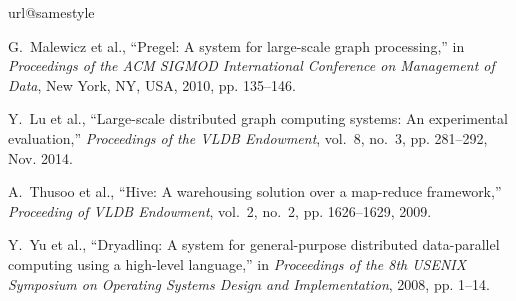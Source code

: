 \documentclass[10pt,journal,compsoc]{IEEEtran}
\begin{document}
% 
% 
%
\begin{thebibliography}{40}
\providecommand{\url}[1]{#1}
\csname url@samestyle\endcsname
\providecommand{\newblock}{\relax}
\providecommand{\bibinfo}[2]{#2}
\providecommand{\BIBentrySTDinterwordspacing}{\spaceskip=0pt\relax}
\providecommand{\BIBentryALTinterwordstretchfactor}{4}
\providecommand{\BIBentryALTinterwordspacing}{\spaceskip=\fontdimen2\font plus
\BIBentryALTinterwordstretchfactor\fontdimen3\font minus
  \fontdimen4\font\relax}
\providecommand{\BIBforeignlanguage}[2]{{%
\expandafter\ifx\csname l@#1\endcsname\relax
\typeout{** WARNING: IEEEtran.bst: No hyphenation pattern has been}%
\typeout{** loaded for the language `#1'. Using the pattern for}%
\typeout{** the default language instead.}%
\else
\language=\csname l@#1\endcsname
\fi
#2}}
\providecommand{\BIBdecl}{\relax}
\BIBdecl

G.~Malewicz et al., ``Pregel: A system for large-scale graph processing,'' in
  \emph{Proceedings of the ACM SIGMOD International Conference on Management of
  Data}, New York, NY, USA, 2010, pp. 135--146.

Y.~Lu et al., ``Large-scale distributed graph computing
  systems: An experimental evaluation,'' \emph{Proceedings of the VLDB
  Endowment}, vol.~8, no.~3, pp. 281--292, Nov. 2014.

A.~Thusoo et al., ``Hive: A warehousing solution over a map-reduce
  framework,'' \emph{Proceeding of VLDB Endowment}, vol.~2, no.~2, pp.
  1626--1629, 2009.

Y.~Yu et al., ``Dryadlinq: A system for general-purpose distributed
  data-parallel computing using a high-level language,'' in \emph{Proceedings
  of the 8th USENIX Symposium on Operating Systems Design and Implementation},
  2008, pp. 1--14.


\end{thebibliography}
\end{document}
